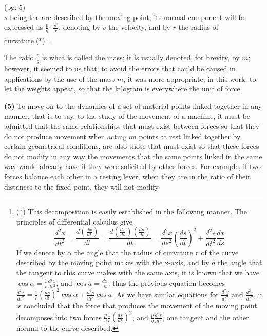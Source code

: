 \documentclass{book}
\begin{document}
\newpage

(pg. 5)
\\
\( s \) being the arc described by the moving point; its normal component will be expressed as \( \frac{p}{g} \cdot \frac{v^2}{r} \), denoting by \( v \) the velocity, and by \( r \) the radius of\\ curvature.(*) \footnote{(*) This decomposition is easily established in the following manner. The principles of differential calculus give
\[
\frac{d^2x}{dt^2} = \frac{d \left( \frac{dx}{dt} \right)}{dt} = \frac{d \left( \frac{dx}{ds} \right) \left( \frac{ds}{dt} \right)}{dt} = \frac{d^2x}{ds^2} \left( \frac{ds}{dt} \right)^2 + \frac{d^2s}{dt^2} \frac{dx}{ds}
\]
If we denote by \( \alpha \) the angle that the radius of curvature \( r \) of the curve described by the moving point makes with the x-axis, and by \( a \) the angle that the tangent to this curve makes with the same axis, it is known that we have \( \cos \alpha = \frac{1}{r} \frac{d^2x}{ds^2} \), and \( \cos a = \frac{dx}{ds} \): thus the previous equation becomes \( \frac{d^2x}{dt^2} = \frac{1}{r} \left( \frac{ds}{dt} \right)^2 \cos \alpha + \frac{d^2s}{dt^2} \cos a \). As we have similar equations for \( \frac{d^2y}{dt^2} \) and \( \frac{d^2z}{dt^2} \), it is concluded that the force that produces the movement of the moving point decomposes into two forces \( \frac{p}{g} \frac{1}{r} \left( \frac{ds}{dt} \right)^2 \), and \( \frac{p}{g} \frac{d^2s}{dt^2} \), one tangent and the other normal to the curve described.}

The ratio \( \frac{p}{g} \) is what is called the mass; it is usually denoted, for brevity, by \( m \); however, it seemed to us that, to avoid the errors that could be caused in applications by the use of the mass \( m \), it was more appropriate, in this work, to let the weights appear, so that the kilogram is everywhere the unit of force.

\textbf{(5)} To move on to the dynamics of a set of material points linked together in any manner, that is to say, to the study of the movement of a machine, it must be admitted that the same relationships that must exist between forces so that they do not produce movement when acting on points at rest linked together by certain geometrical conditions, are also those that must exist so that these forces do not modify in any way the movements that the same points linked in the same way would already have if they were solicited by other forces. For example, if two forces balance each other in a resting lever, when they are in the ratio of their distances to the fixed point, they will not modify 
\end{document}
